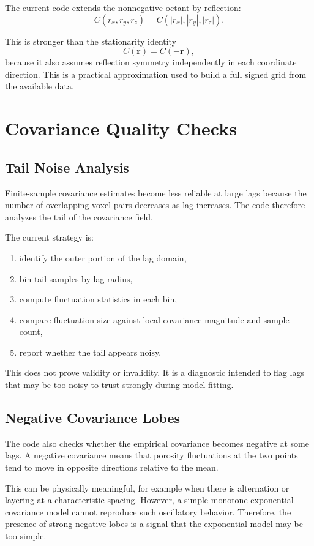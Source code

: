 \documentclass[11pt]{article}
\begin{document}
The current code extends the nonnegative octant by reflection:
\[
C(r_x,r_y,r_z) = C(|r_x|,|r_y|,|r_z|).
\]

This is stronger than the stationarity identity
\[
C(\bm{r}) = C(-\bm{r}),
\]
because it also assumes reflection symmetry independently in each coordinate
direction. This is a practical approximation used to build a full signed grid
from the available data.

\section{Covariance Quality Checks}
\subsection{Tail Noise Analysis}
Finite-sample covariance estimates become less reliable at large lags because the
number of overlapping voxel pairs decreases as lag increases. The code therefore
analyzes the tail of the covariance field.

The current strategy is:
\begin{enumerate}[label=\arabic*.]
\item identify the outer portion of the lag domain,
\item bin tail samples by lag radius,
\item compute fluctuation statistics in each bin,
\item compare fluctuation size against local covariance magnitude and sample
count,
\item report whether the tail appears noisy.
\end{enumerate}

This does not prove validity or invalidity. It is a diagnostic intended to flag
lags that may be too noisy to trust strongly during model fitting.

\subsection{Negative Covariance Lobes}
The code also checks whether the empirical covariance becomes negative at some
lags. A negative covariance means that porosity fluctuations at the two points
tend to move in opposite directions relative to the mean.

This can be physically meaningful, for example when there is alternation or
layering at a characteristic spacing. However, a simple monotone exponential
covariance model cannot reproduce such oscillatory behavior. Therefore, the
presence of strong negative lobes is a signal that the exponential model may be
too simple.
\end{document}
